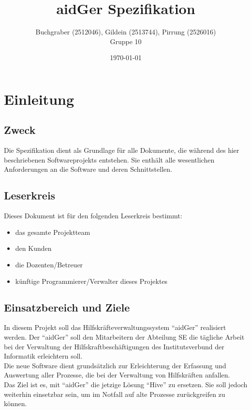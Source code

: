 \documentclass[oneside,german,oneside]{scrbook}
\title{aidGer Spezifikation}
\author{Buchgraber (2512046), Gildein (2513744), Pirrung (2526016)\\
Gruppe 10}
\date{\today}
\begin{document}
\subject{- vertrauliches Dokument -}

\maketitle
\pagebreak

\tableofcontents
\pagebreak

\section{Einleitung}\label{sec:Einleitung}

    \subsection{Zweck}\label{sec:Zweck}

        Die Spezifikation dient als Grundlage f\"ur alle Dokumente, die w\"ahrend
        des hier beschriebenen Softwareprojekts entstehen. Sie enth\"alt alle
        wesentlichen Anforderungen an die Software und deren Schnittstellen.

    \subsection{Leserkreis}\label{sec:Leserkreis}

        Dieses Dokument ist f\"ur den folgenden Leserkreis bestimmt:

        \begin{itemize}
          \item das gesamte Projektteam
          \item den Kunden
          \item die Dozenten/Betreuer
          \item k\"unftige Programmierer/Verwalter dieses Projektes
        \end{itemize}

    \subsection{Einsatzbereich und Ziele}\label{sec:Einsatzbereich}

        In diesem Projekt soll das Hilfskräfteverwaltungssystem
        ``aidGer'' realisiert werden. Der ``aidGer'' soll den Mitarbeitern
        der Abteilung SE die tägliche Arbeit bei der Verwaltung
        der Hilfskraftbeschäftigungen des Institutsverbund der Informatik
        erleichtern soll. \\
        Die neue Software dient grundsätzlich zur Erleichterung der 
        Erfassung und Auswertung aller Prozesse, die bei der Verwaltung 
        von Hilfskräften anfallen. \\
        Das Ziel ist es, mit ``aidGer'' die jetzige Lösung ``Hive'' zu 
        ersetzen. Sie soll jedoch weiterhin einsetzbar sein, um im Notfall
        auf alte Prozesse zurückgreifen zu können.
\end{document}
